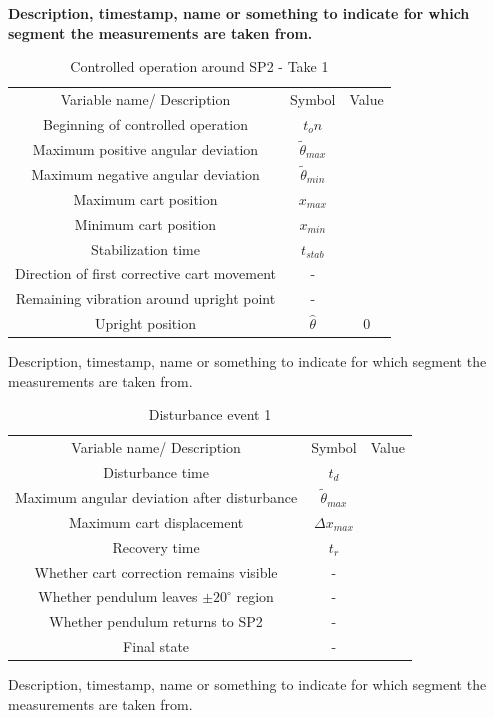 \textbf{Description, timestamp, name or something to indicate for which segment the measurements are taken from.}
\begin{table}
    \centering
    \begin{tabular}{ccc}
         Variable name/ Description&  Symbol & Value\\
         Beginning of controlled operation&  $t_on$& \\
         Maximum positive angular deviation&  $\tilde\theta_{max}$& \\
         Maximum negative angular deviation&  $\tilde\theta_{min}$& \\
         Maximum cart position&  $x_{max}$& \\
         Minimum cart position&  $x_{min}$& \\
         Stabilization time&  $t_{stab}$& \\
         Direction of first corrective cart movement&  -& \\
         Remaining vibration around upright point&  -& \\
 Upright position& $\hat\theta$&0\\
    \end{tabular}
    \caption{Controlled operation around SP2 - Take 1}
    \label{tab:placeholder}
\end{table}
Description, timestamp, name or something to indicate for which segment the measurements are taken from.
\begin{table}
    \centering
    \begin{tabular}{ccc}
         Variable name/ Description&  Symbol & Value\\
         Disturbance time&  $t_d$& \\
         Maximum angular deviation after disturbance&  $\tilde\theta_{max}$& \\
         Maximum cart displacement&  $\Delta x_{max}$& \\
         Recovery time&  $t_r$& \\
         Whether cart correction remains visible&  -& \\
 Whether pendulum leaves $\pm 20^\circ$ region& -&\\
 Whether pendulum returns to SP2& -&\\
 Final state& -&\\
    \end{tabular}
    \caption{Disturbance event 1}
    \label{tab:placeholder}
\end{table}
Description, timestamp, name or something to indicate for which segment the measurements are taken from.
